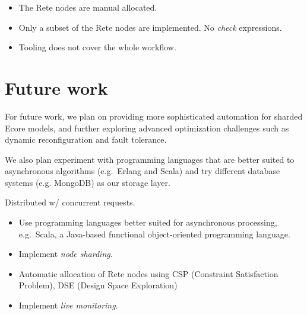 \begin{itemize}
  \item The Rete nodes are manual allocated.
  \item Only a subset of the Rete nodes are implemented. No \emph{check} expressions. 
  \item Tooling does not cover the whole workflow.   
\end{itemize}

\section{Future work}
\label{future-work}

For future work, we plan on providing more sophisticated automation for sharded Ecore models, and further exploring advanced optimization challenges such as dynamic reconfiguration and fault tolerance.

We also plan experiment with programming languages that are better suited to asynchronous algorithms (e.g.\ Erlang and Scala) and try different database systems (e.g. MongoDB) as our storage layer.

Distributed \tb{} w/ concurrent requests.

\begin{itemize}
  \item Use programming languages better suited for asynchronous processing, e.g.\ Scala, a Java-based functional object-oriented programming language.
  \item Implement \emph{node sharding}.
  \item Automatic allocation of Rete nodes using CSP (Constraint Satisfaction Problem), DSE (Design Space Exploration) \cite{DSE11}
  \item Implement \emph{live monitoring}. 
\end{itemize}
